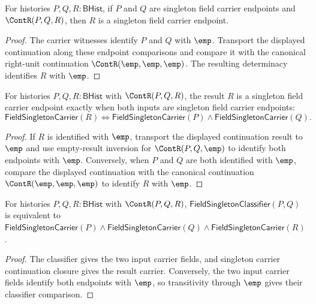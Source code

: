 \begin{theorem}
\label{thm:field-singleton-carrier-continuation-closed}
For histories $P,Q,R:\mathsf{BHist}$, if $P$ and $Q$ are singleton field
carrier endpoints and $\ContR(P,Q,R)$, then $R$ is a singleton field carrier
endpoint.
\end{theorem}
\begin{proof}
The carrier witnesses identify $P$ and $Q$ with $\emp$. Transport the
displayed continuation along these endpoint comparisons and compare it with
the canonical right-unit continuation $\ContR(\emp,\emp,\emp)$. The resulting
determinacy identifies $R$ with $\emp$.
\end{proof}
\begin{theorem}
\label{thm:field-singleton-carrier-continuation-endpoint-split}
For histories $P,Q,R:\mathsf{BHist}$ with $\ContR(P,Q,R)$, the result $R$
is a singleton field carrier endpoint exactly when both inputs are singleton
field carrier endpoints:
$$
\mathsf{FieldSingletonCarrier}(R)\Longleftrightarrow
\mathsf{FieldSingletonCarrier}(P)\wedge\mathsf{FieldSingletonCarrier}(Q).
$$
\end{theorem}
\begin{proof}
If $R$ is identified with $\emp$, transport the displayed continuation result
to $\emp$ and use empty-result inversion for $\ContR(P,Q,\emp)$ to identify
both endpoints with $\emp$. Conversely, when $P$ and $Q$ are both identified
with $\emp$, compare the displayed continuation with the canonical
continuation $\ContR(\emp,\emp,\emp)$ to identify $R$ with $\emp$.
\end{proof}

\begin{theorem}
\label{thm:field-singleton-classifier-continuation-endpoint-split}
For histories $P,Q,R:\mathsf{BHist}$ with $\ContR(P,Q,R)$,
$\mathsf{FieldSingletonClassifier}(P,Q)$ is equivalent to
$\mathsf{FieldSingletonCarrier}(P)\land\mathsf{FieldSingletonCarrier}(Q)\land\mathsf{FieldSingletonCarrier}(R)$.
\end{theorem}
\begin{proof}
The classifier gives the two input carrier fields, and singleton carrier
continuation closure gives the result carrier. Conversely, the two input
carrier fields identify both endpoints with $\emp$, so transitivity through $\emp$ gives their classifier comparison.
\end{proof}
